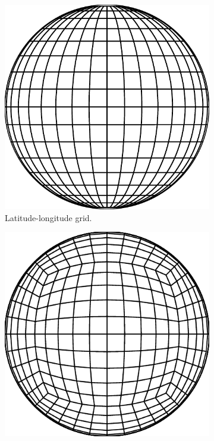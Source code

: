 \begin{figure}
  \centering
  \begin{subfigure}[t]{0.37\textwidth}
    \includegraphics[width=1.0\textwidth]{figures/appendices/lat-lon-grid.pdf}
    \caption{Latitude-longitude grid.}
    \label{fig:gcm-grids-ll}
  \end{subfigure}
  \quad\quad\quad
  \begin{subfigure}[t]{0.37\textwidth}
    \includegraphics[width=1.0\textwidth]{figures/appendices/cubed-sphere-grid.pdf}

\end{subfigure}
\end{figure}
